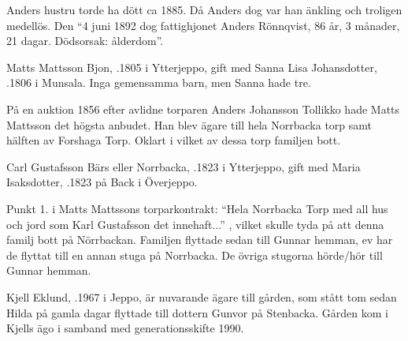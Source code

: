 Anders hustru torde ha dött ca 1885. Då Anders dog var han änkling och troligen medellös. Den ``4 juni 1892 dog fattighjonet Anders Rönnqvist, 86 år, 3 månader, 21 dagar. Dödsorsak: ålderdom''.


Matts Mattsson Bjon, .1805 i Ytterjeppo, gift med Sanna Lisa Johansdotter, .1806 i Munsala. Inga gemensamma barn, men Sanna hade tre.
\begin{jhchildren}
  \item {}
  \item {}
  \item {}
\end{jhchildren}
På en auktion 1856 efter avlidne torparen Anders Johansson Tollikko hade Matts Mattsson det högsta anbudet. Han blev ägare till hela	Norrbacka torp samt hälften av Forshaga Torp. Oklart i vilket av dessa torp  familjen bott.


Carl Gustafsson Bärs eller Norrbacka, .1823 i Ytterjeppo, gift med Maria Isaksdotter, .1823 på Back i Överjeppo.
\begin{jhchildren}
  \item {}
  \item {}
  \item {}
  \item {}
  \item {}
  \item {}
\end{jhchildren}
Punkt 1. i  Matts Mattssons torparkontrakt: ``Hela Norrbacka Torp med all hus och jord som Karl Gustafsson det innehaft...'' , vilket skulle tyda på att denna familj bott på Nörrbackan. Familjen flyttade sedan till Gunnar hemman, ev har de flyttat till en annan stuga på Norrbacka. De övriga stugorna hörde/hör till Gunnar hemman.




Kjell Eklund, .1967 i Jeppo, är nuvarande ägare till gården, som stått tom sedan Hilda på gamla dagar flyttade till dottern Gunvor på Stenbacka. Gården kom i Kjells ägo i samband med generationsskifte 1990.


